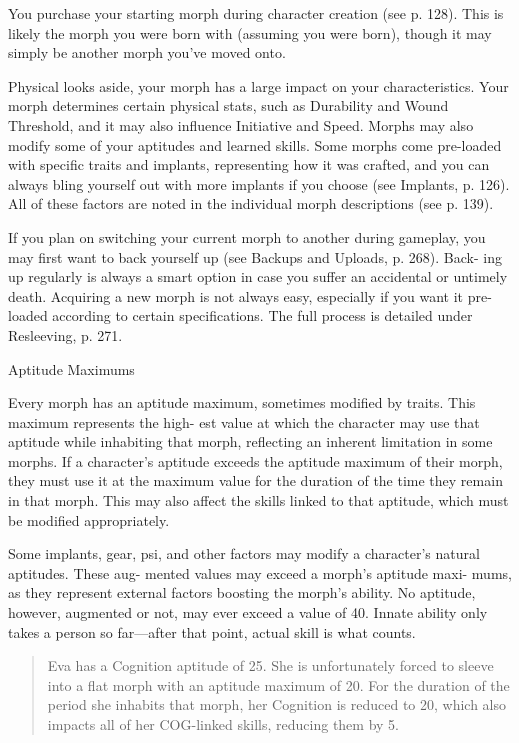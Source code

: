 You purchase your starting morph during character
creation (see p. 128). This is likely the morph you
were born with (assuming you were born), though it
may simply be another morph you've moved onto.

Physical looks aside, your morph has a large impact
on your characteristics. Your morph determines certain
physical stats, such as Durability and Wound Threshold,
and it may also influence Initiative and Speed. Morphs
may also modify some of your aptitudes and learned
skills. Some morphs come pre-loaded with specific traits
and implants, representing how it was crafted, and you
can always bling yourself out with more implants if
you choose (see Implants, p. 126). All of these factors
are noted in the individual morph descriptions (see
p. 139).

If you plan on switching your current morph to
another during gameplay, you may first want to back
yourself up (see Backups and Uploads, p. 268). Back-
ing up regularly is always a smart option in case you
suffer an accidental or untimely death. Acquiring a
new morph is not always easy, especially if you want
it pre-loaded according to certain specifications. The
full process is detailed under Resleeving, p. 271.

Aptitude Maximums

Every morph has an aptitude maximum, sometimes
modified by traits. This maximum represents the high-
est value at which the character may use that aptitude
while inhabiting that morph, reflecting an inherent
limitation in some morphs. If a character's aptitude
exceeds the aptitude maximum of their morph, they
must use it at the maximum value for the duration
of the time they remain in that morph. This may also
affect the skills linked to that aptitude, which must be
modified appropriately.

Some implants, gear, psi, and other factors may
modify a character's natural aptitudes. These aug-
mented values may exceed a morph's aptitude maxi-
mums, as they represent external factors boosting the
morph's ability. No aptitude, however, augmented or
not, may ever exceed a value of 40. Innate ability only
takes a person so far—after that point, actual skill is
what counts.

\begin{quotation}
  Eva has a Cognition aptitude of 25. She is unfortunately forced to
  sleeve into a flat morph with an aptitude maximum of 20. For the
  duration of the period she inhabits that morph, her Cognition is
  reduced to 20, which also impacts all of her COG-linked skills,
  reducing them by 5.
\end{quotation}

